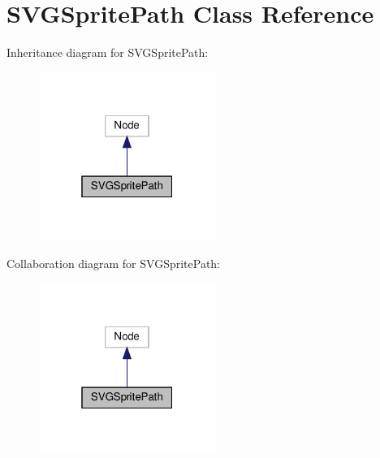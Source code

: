 \hypertarget{classSVGSpritePath}{}\section{S\+V\+G\+Sprite\+Path Class Reference}
\label{classSVGSpritePath}


Inheritance diagram for S\+V\+G\+Sprite\+Path\+:
\nopagebreak
\begin{figure}[H]
\begin{center}
\leavevmode
\includegraphics[width=163pt]{classSVGSpritePath__inherit__graph}
\end{center}
\end{figure}


Collaboration diagram for S\+V\+G\+Sprite\+Path\+:
\nopagebreak
\begin{figure}[H]
\begin{center}
\leavevmode
\includegraphics[width=163pt]{classSVGSpritePath__coll__graph}
\end{center}
\end{figure}
